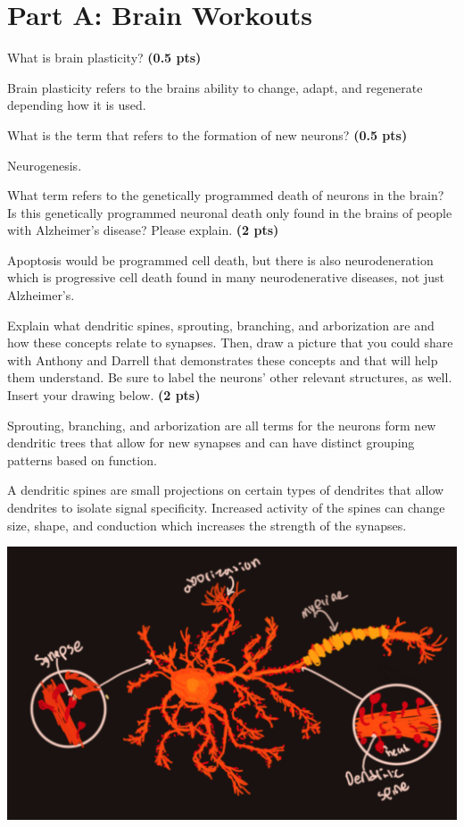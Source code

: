 \documentclass[12pt,a4paper]{article}
\begin{document}
\section*{Part A: Brain Workouts}
\begin{enumerate}[font=\bfseries, wide]
    {\color{under}\item What is brain plasticity? \textbf{(0.5 pts)}}

    Brain plasticity refers to the brains ability to change, adapt, and regenerate depending how it is used. 

    {\color{under}\item What is the term that refers to the formation of new neurons? \textbf{(0.5 pts)}}

    Neurogenesis.
    
    {\color{under}\item What term refers to the genetically programmed death of neurons in the brain? Is this genetically programmed neuronal death only found in the brains of people with Alzheimer’s disease? Please explain. \textbf{(2 pts)}}

    Apoptosis would be programmed cell death, but there is also neurodeneration which is progressive cell death found in many neurodenerative diseases, not just Alzheimer’s.

    {\color{under}\item Explain what dendritic spines, sprouting, branching, and arborization are and how these concepts relate to synapses. Then, draw a picture that you could share with Anthony and Darrell that demonstrates these concepts and that will help them understand. Be sure to label the neurons’ other relevant structures, as well. Insert your drawing below.  \textbf{(2 pts)}}

    Sprouting, branching, and arborization are all terms for the neurons form new dendritic trees that allow for new synapses and can have distinct grouping patterns based on function.

    A dendritic spines are small projections on certain types of dendrites that allow dendrites to isolate signal specificity. Increased activity of the spines can change size, shape, and conduction which increases the strength of the synapses.

    \includegraphics[width=\linewidth]{images/neuron.png}
    


\end{enumerate}
\end{document}
